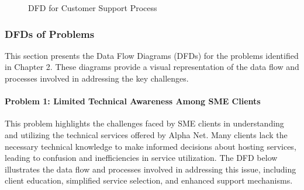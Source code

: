 \begin{figure}[H]
    \caption{DFD for Customer Support Process}
    \label{fig:dfd_support}
\end{figure}

\subsubsection{DFDs of Problems}

This section presents the Data Flow Diagrams (DFDs) for the problems identified in Chapter 2. These diagrams provide a visual representation of the data flow and processes involved in addressing the key challenges.

\paragraph{Problem 1: Limited Technical Awareness Among SME Clients}
This problem highlights the challenges faced by SME clients in understanding and utilizing the technical services offered by Alpha Net. Many clients lack the necessary technical knowledge to make informed decisions about hosting services, leading to confusion and inefficiencies in service utilization. The DFD below illustrates the data flow and processes involved in addressing this issue, including client education, simplified service selection, and enhanced support mechanisms.

